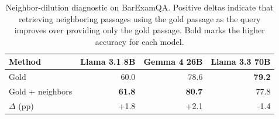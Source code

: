 \begin{table}[H]
\centering
\caption{Neighbor-dilution diagnostic on BarExamQA. Positive deltas indicate that retrieving neighboring passages using the gold passage as the query improves over providing only the gold passage. Bold marks the higher accuracy for each model.}
\label{tab:neighbor_dilution}
\footnotesize
\setlength{\tabcolsep}{6pt}
\begin{tabular}{lrrr}
\toprule
Method & Llama 3.1 8B & Gemma 4 26B & Llama 3.3 70B \\
\midrule
Gold             & 60.0          & 78.6          & \textbf{79.2} \\
Gold + neighbors & \textbf{61.8} & \textbf{80.7} & 77.8          \\
\midrule
$\Delta$ (pp)    & +1.8          & +2.1          & -1.4          \\
\bottomrule
\end{tabular}
\end{table}